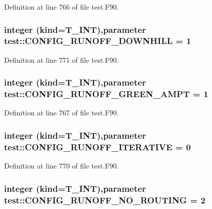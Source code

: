Definition at line 766 of file test.F90.

\hypertarget{namespacetest_a27b920f67f809bcc8d0cc06a9632d4f2}{
\subsubsection[{CONFIG\_\-RUNOFF\_\-DOWNHILL}]{\setlength{\rightskip}{0pt plus 5cm}integer (kind={\bf T\_\-INT}),parameter {\bf test::CONFIG\_\-RUNOFF\_\-DOWNHILL} = 1}}
\label{namespacetest_a27b920f67f809bcc8d0cc06a9632d4f2}


Definition at line 771 of file test.F90.

\hypertarget{namespacetest_aaef68858ea9447158dabcb1edc0bc51c}{
\subsubsection[{CONFIG\_\-RUNOFF\_\-GREEN\_\-AMPT}]{\setlength{\rightskip}{0pt plus 5cm}integer (kind={\bf T\_\-INT}),parameter {\bf test::CONFIG\_\-RUNOFF\_\-GREEN\_\-AMPT} = 1}}
\label{namespacetest_aaef68858ea9447158dabcb1edc0bc51c}


Definition at line 767 of file test.F90.

\hypertarget{namespacetest_a7359910b1beaefb9b4c414836e39093b}{
\subsubsection[{CONFIG\_\-RUNOFF\_\-ITERATIVE}]{\setlength{\rightskip}{0pt plus 5cm}integer (kind={\bf T\_\-INT}),parameter {\bf test::CONFIG\_\-RUNOFF\_\-ITERATIVE} = 0}}
\label{namespacetest_a7359910b1beaefb9b4c414836e39093b}


Definition at line 770 of file test.F90.

\hypertarget{namespacetest_a53493938592d43a28a0b3efc51753e2d}{
\subsubsection[{CONFIG\_\-RUNOFF\_\-NO\_\-ROUTING}]{\setlength{\rightskip}{0pt plus 5cm}integer (kind={\bf T\_\-INT}),parameter {\bf test::CONFIG\_\-RUNOFF\_\-NO\_\-ROUTING} = 2}}
\label{namespacetest_a53493938592d43a28a0b3efc51753e2d}


